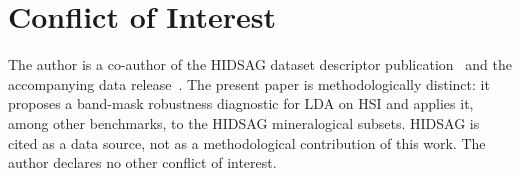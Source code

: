 \documentclass[conference,a4paper,10pt]{IEEEtran}
\begin{document}
\section*{Conflict of Interest}

The author is a co-author of the HIDSAG dataset descriptor
publication~\cite{hidsag2023} and the accompanying data
release~\cite{hidsag2023figshare}. The present paper is
methodologically distinct: it proposes a band-mask robustness
diagnostic for LDA on HSI and applies it, among other benchmarks,
to the HIDSAG mineralogical subsets. HIDSAG is cited as a data
source, not as a methodological contribution of this work. The
author declares no other conflict of interest.



\end{document}
